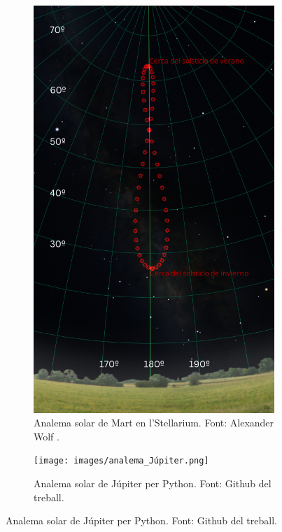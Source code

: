 \documentclass[a4paper, 11pt]{article}
\begin{document}
\begin{figure}[h!]
\begin{subfigure}{0.38\textwidth}
        \includegraphics[width=\textwidth]{images/analema_Terra_stellarium.png}
        \caption{Analema solar de Mart en l'Stellarium. Font: Alexander Wolf \cite{SCRIPT_STELLARIUM}.}
    \end{subfigure}
    \begin{subfigure}{0.52\textwidth}
        \centering
        \texttt{[image: images/analema\_Júpiter.png]}
        \caption{Analema solar de Júpiter per Python. Font: Github del treball.}
    \end{subfigure}
    \hspace{0.05\textwidth}

\end{figure}
\end{document}
